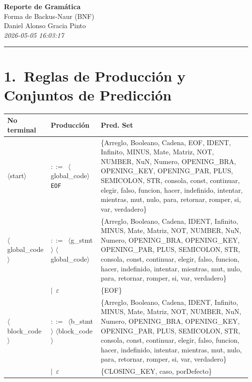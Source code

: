 \documentclass[10pt]{article}
\begin{document}
\begin{center}
  {\LARGE\textbf{Reporte de Gramática}}\\[0.4em]
  {\large Forma de Backus-Naur (BNF)}\\[0.3em]
  {\large Daniel Alonso Gracia Pinto}\\[0.2em]
  \textit{2026-05-05 16:03:17}
\end{center}
\vspace{0.5em}\hrule\vspace{1em}
\section*{1.\ Reglas de Producción y Conjuntos de Predicción}
{\footnotesize
\begin{longtable}{@{} p{2.0cm} p{6.9cm} p{6.9cm} @{}}
  \toprule
  \textbf{No terminal} & \textbf{Producción} & \textbf{Pred. Set} \\
  \midrule \endhead
  \textcolor{ntcolor}{\parbox[t]{1.8cm}{\raggedright$\langle$start$\rangle$}} & $::=$~$\langle$global\_code$\rangle$ \texttt{EOF} & \{Arreglo, Booleano, Cadena, EOF, IDENT, Infinito, MINUS, Mate, Matriz, NOT, NUMBER, NuN, Numero, OPENING\_BRA, OPENING\_KEY, OPENING\_PAR, PLUS, SEMICOLON, STR, consola, const, continuar, elegir, falso, funcion, hacer, indefinido, intentar, mientras, mut, nulo, para, retornar, romper, si, var, verdadero\} \\
  \midrule
  \textcolor{ntcolor}{\parbox[t]{1.8cm}{\raggedright$\langle$global\_\allowbreak{}code$\rangle$}} & $::=$~$\langle$g\_stmt$\rangle$ $\langle$global\_code$\rangle$ & \{Arreglo, Booleano, Cadena, IDENT, Infinito, MINUS, Mate, Matriz, NOT, NUMBER, NuN, Numero, OPENING\_BRA, OPENING\_KEY, OPENING\_PAR, PLUS, SEMICOLON, STR, consola, const, continuar, elegir, falso, funcion, hacer, indefinido, intentar, mientras, mut, nulo, para, retornar, romper, si, var, verdadero\} \\
   & $\mid$~$\varepsilon$ & \{EOF\} \\
  \midrule
  \textcolor{ntcolor}{\parbox[t]{1.8cm}{\raggedright$\langle$block\_\allowbreak{}code$\rangle$}} & $::=$~$\langle$b\_stmt$\rangle$ $\langle$block\_code$\rangle$ & \{Arreglo, Booleano, Cadena, IDENT, Infinito, MINUS, Mate, Matriz, NOT, NUMBER, NuN, Numero, OPENING\_BRA, OPENING\_KEY, OPENING\_PAR, PLUS, SEMICOLON, STR, consola, const, continuar, elegir, falso, funcion, hacer, indefinido, intentar, mientras, mut, nulo, para, retornar, romper, si, var, verdadero\} \\
   & $\mid$~$\varepsilon$ & \{CLOSING\_KEY, caso, porDefecto\} \\

\end{longtable}}
\end{document}
